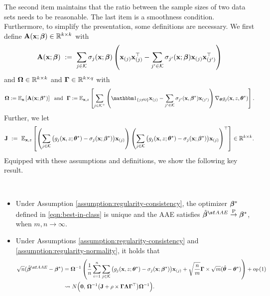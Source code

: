  The second item maintains that the ratio between the sample sizes of two data sets needs to be reasonable. The last item is a smoothness condition. Furthermore, to simplify the presentation, some definitions are necessary. We first define 
$\mathbf{A}(\mathbf{x}; \bm{\beta}) \in \mathbb{R}^{k \times k}$ with 
\begin{align}
\label{eqn:A-def}
    \mathbf{A}(\mathbf{x}; \bm{\beta})~:=~ \sum_{j \in \mathcal{K}}\sigma_{j}(\mathbf{x}; \bm{\beta})\left(
\mathbf{x}_{(j)} \mathbf{x}_{(j)}^{\top} - 
\sum_{j' \in \mathcal{K}} \sigma_{j'}(\mathbf{x}; \bm{\beta})\mathbf{x}_{(j)} \mathbf{x}_{(j')}^{\top}
\right)
\end{align}
and $\bm{\Omega} \in  \mathbb{R}^{k \times k}$ and $\bm{\Gamma} \in \mathbb{R}^{k \times q}$ with 
\begin{align}
\label{eqn:Omega-Gamma}
    \Omegavec := \E_{\x}\left[\Avec(\x;\betavec^*) \right] ~\text{ and }~ \Gammavec := \E_{\x,z}\left[\sum_{j \in \Kscr^+} \left(\ind_{\{j\neq 0\}}\x_{(j)} - \sum_{j' \in \Kscr}\sigma_{j'}(\x, \betavec^*)\x_{(j')}\right)\nabla_{\thetavec} g_j(\x, z, \thetavec^*)\right].
\end{align}
Further, we let 
$$
\mathbf{J} ~:=~ \mathbb{E}_{\mathbf{x},z}\left[
\left(\sum_{j\in \mathcal{K}}\big(g_j(\mathbf{x}, z; {\bm{\theta}}^*) - \sigma_{j}(\mathbf{x}; \bm{\beta}^*)\big)\mathbf{x}_{(j)}\right)
\left(\sum_{j\in \mathcal{K}}\big(g_j(\mathbf{x}, z; {\bm{\theta}}^*) - \sigma_{j}(\mathbf{x}; \bm{\beta}^*)\big)\mathbf{x}_{(j)}\right)^{\top}
\right] \in \mathbb{R}^{k \times k}.
$$
Equipped with these assumptions and definitions, we show the following key result. 

\begin{thm}
\label{thm:consistency}
~
\begin{itemize}
    \item [$(i)$] Under Assumption \ref{assumption:regularity-consistency}, the optimizer  
    $\bm{\beta}^*$ defined in \eqref{eqn:best-in-class} is unique and the AAE satisfies 
    $\hat{\betavec}^{\sf AAE} \pconverge \betavec^*$, when $m,n\rightarrow \infty$.

    \item [$(ii)$] Under Assumptions \ref{assumption:regularity-consistency} and \ref{assumption:regularity-normality}, it holds that 
    \begin{align*}
            \sqrt{n}(\hat{\betavec}^{\sf AAE} - \betavec^*)&= \Omegavec^{-1} \left(\frac{1}{n}\sum_{i=1}^n  \sum_{j\in \Kscr}\big(g_j(\x, z; {\thetavec}^*) - \sigma_{j}(\x; \betavec^*)\big)\x_{(j)} + \sqrt{\frac{n}{m}} \Gammavec\times \sqrt{m}(\hat{\thetavec} - \thetavec^*)\right) + o_{\text{\upshape{P}}}(1)\\
    &\rightsquigarrow N\Big(\Ovec,\, \Omegavec^{-1}\big(\Jvec + \rho\times\Gammavec\Lambdavec\Gammavec^{\top}\big)\Omegavec^{-1}\Big).
    \end{align*}
\end{itemize}
\end{thm}


